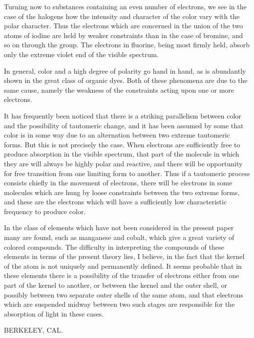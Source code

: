 \documentclass[11pt]{memoir}
\begin{document}
Turning now to substances containing an even number of electrons, we see in the case of the halogens how the intensity and character of the color vary with the polar character.  Thus the electrons which are concerned in the union of the two atoms of iodine are held by weaker constraints than in the case of bromine, and so on through the group. The electrons in fluorine, being most firmly held, absorb only the extreme violet end of the visible spectrum.

In general, color and a high degree of polarity go hand in hand, as is abundantly shown in the great class of organic dyes.  Both of these phenomena are due to the same cause, namely the weakness of the constraints acting upon one or more electrons.

It has frequently been noticed that there is a striking parallelism between color and the possibility of tautomeric change, and it has been assumed by some that color is in some way due to an alternation between two extreme tautomeric forms.  But this is not precisely the case.  When electrons are sufficiently free to produce absorption in the visible spectrum, that part of the molecule in which they are will always be highly polar and reactive, and there will be opportunity for free transition from one limiting form to another.  Thus if a tautomeric process consists chiefly in the movement of electrons, there will be electrons in some molecules which are hung by loose constraints between the two extreme forms, and these are the electrons which will have a sufficiently low characteristic frequency to produce color.

In the class of elements which have not been considered in the present paper many are found, such as manganese and cobalt, which give a great variety of colored compounds.  The difficulty in interpreting the compounds of these elements in terms of the present theory lies, I believe, in the fact that the kernel of the atom is not uniquely and permanently defined.  It seems probable that in these elements there is a possibility of the transfer of electrons either from one part of the kernel to another, or between the kernel and the outer shell, or possibly between two separate outer shells of the same atom, and that electrons which are suspended midway between two such stages are responsible for the absorption of light in these cases. \vspace{5 mm}

BERKELEY, CAL.


\newpage
\end{document}
